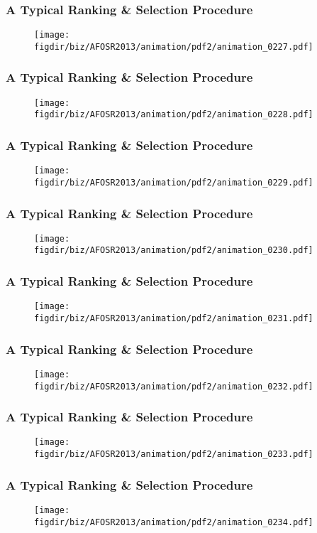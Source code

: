 \documentclass[13pt]{beamer}
\newcommand{\figdir}{../../fig}
\begin{document}
\begin{frame}\frametitle{A Typical Ranking \& Selection Procedure}\begin{figure}\texttt{[image: \\figdir/biz/AFOSR2013/animation/pdf2/animation\_0227.pdf]}\end{figure}\end{frame}
\begin{frame}\frametitle{A Typical Ranking \& Selection Procedure}\begin{figure}\texttt{[image: \\figdir/biz/AFOSR2013/animation/pdf2/animation\_0228.pdf]}\end{figure}\end{frame}
\begin{frame}\frametitle{A Typical Ranking \& Selection Procedure}\begin{figure}\texttt{[image: \\figdir/biz/AFOSR2013/animation/pdf2/animation\_0229.pdf]}\end{figure}\end{frame}
\begin{frame}\frametitle{A Typical Ranking \& Selection Procedure}\begin{figure}\texttt{[image: \\figdir/biz/AFOSR2013/animation/pdf2/animation\_0230.pdf]}\end{figure}\end{frame}
\begin{frame}\frametitle{A Typical Ranking \& Selection Procedure}\begin{figure}\texttt{[image: \\figdir/biz/AFOSR2013/animation/pdf2/animation\_0231.pdf]}\end{figure}\end{frame}
\begin{frame}\frametitle{A Typical Ranking \& Selection Procedure}\begin{figure}\texttt{[image: \\figdir/biz/AFOSR2013/animation/pdf2/animation\_0232.pdf]}\end{figure}\end{frame}
\begin{frame}\frametitle{A Typical Ranking \& Selection Procedure}\begin{figure}\texttt{[image: \\figdir/biz/AFOSR2013/animation/pdf2/animation\_0233.pdf]}\end{figure}\end{frame}
\begin{frame}\frametitle{A Typical Ranking \& Selection Procedure}\begin{figure}\texttt{[image: \\figdir/biz/AFOSR2013/animation/pdf2/animation\_0234.pdf]}\end{figure}\end{frame}
\end{document}
